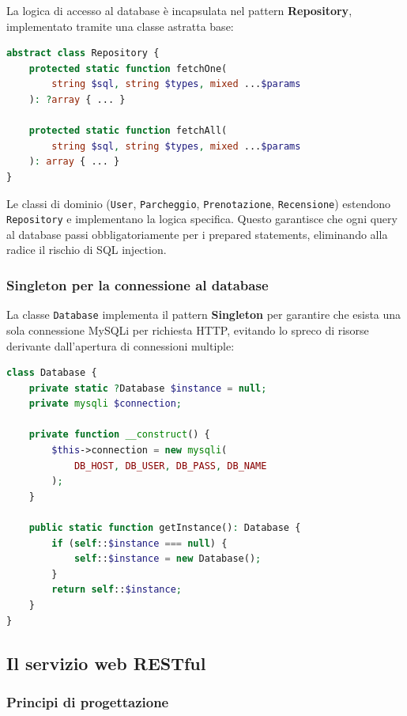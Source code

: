 \documentclass[12pt, a4paper]{article}
\begin{document}
La logica di accesso al database è incapsulata nel pattern \textbf{Repository},
implementato tramite una classe astratta base:

\begin{lstlisting}[language=PHP, caption={Classe Repository — metodi di accesso generici al DB.}]
abstract class Repository {
    protected static function fetchOne(
        string $sql, string $types, mixed ...$params
    ): ?array { ... }

    protected static function fetchAll(
        string $sql, string $types, mixed ...$params
    ): array { ... }
}
\end{lstlisting}

Le classi di dominio (\texttt{User}, \texttt{Parcheggio}, \texttt{Prenotazione},
\texttt{Recensione}) estendono \texttt{Repository} e implementano la logica
specifica. Questo garantisce che ogni query al database passi obbligatoriamente
per i prepared statements, eliminando alla radice il rischio di SQL injection.

\subsubsection{Singleton per la connessione al database}

La classe \texttt{Database} implementa il pattern \textbf{Singleton} per garantire
che esista una sola connessione MySQLi per richiesta HTTP, evitando lo spreco di
risorse derivante dall'apertura di connessioni multiple:

\begin{lstlisting}[language=PHP, caption={Pattern Singleton per la connessione al database.}]
class Database {
    private static ?Database $instance = null;
    private mysqli $connection;

    private function __construct() {
        $this->connection = new mysqli(
            DB_HOST, DB_USER, DB_PASS, DB_NAME
        );
    }

    public static function getInstance(): Database {
        if (self::$instance === null) {
            self::$instance = new Database();
        }
        return self::$instance;
    }
}
\end{lstlisting}

\subsection{Il servizio web RESTful}

\subsubsection{Principi di progettazione}
\end{document}
